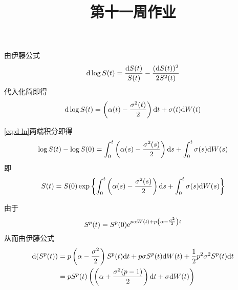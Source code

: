 \documentclass[cn]{homework}
\title{第十一周作业}
\begin{document}
    \maketitle
    
    \problem[习题4.5]
    \begin{subproblem}
        \item
        由伊藤公式
        \[\mathrm d\log S(t)=\frac{\mathrm d S(t)}{S(t)}-\frac{(\mathrm d S(t))^2}{2S^2(t)}\]
        代入化简即得
        \begin{equation}
            \label{eq:d ln}
            \mathrm d\log S(t)=\left(\alpha(t)-\frac{\sigma^2(t)}{2}\right)\mathrm d t
            +\sigma(t)\mathrm d W(t)
        \end{equation}

        \item
        \cref{eq:d ln}两端积分即得
        \[\log S(t)-\log S(0)
        =\int_0^t\left(\alpha(s)-\frac{\sigma^2(s)}{2}\right)\mathrm d s
        +\int_0^t\sigma(s)\mathrm d W(s)\]
        即
        \[S(t)=S(0)\exp\left\{
        \int_0^t\left(\alpha(s)-\frac{\sigma^2(s)}{2}\right)\mathrm d s
        +\int_0^t\sigma(s)\mathrm d W(s)
        \right\}\]
    \end{subproblem}

    \problem[习题4.6]
    由于
    \[S^p(t)=S^p(0)\mathrm e^{p\alpha W(t)+p\left(\alpha-\frac{\sigma^2}{2}\right)t}\]
    从而由伊藤公式
    \[\begin{aligned}
        \mathrm d(S^p(t))&=p\left(\alpha-\frac{\sigma^2}{2}\right)S^p(t)\mathrm d t
        +p\sigma S^p(t)\mathrm d W(t)+\frac{1}{2}p^2\sigma^2S^p(t)\mathrm d t\\
        &=pS^p(t)\left(
        \left(\alpha+\frac{\sigma^2(p-1)}{2}\right)\mathrm d t+\sigma\mathrm d W(t)
        \right)
    \end{aligned}\]
\end{document}
